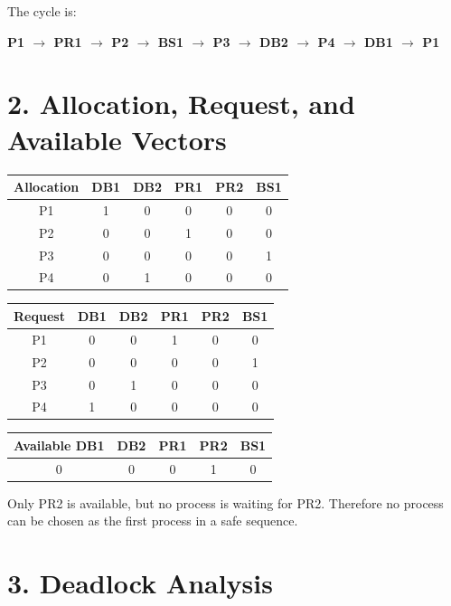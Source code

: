 \documentclass[12pt,a4paper]{article}
\begin{document}
The cycle is:

\begin{center}
\textbf{P1 $\rightarrow$ PR1 $\rightarrow$ P2 $\rightarrow$ BS1 $\rightarrow$ P3 $\rightarrow$ DB2 $\rightarrow$ P4 $\rightarrow$ DB1 $\rightarrow$ P1}
\end{center}

\section*{2. Allocation, Request, and Available Vectors}

\begin{center}
\begin{tabular}{c c c c c c}
\toprule
\textbf{Allocation} & DB1 & DB2 & PR1 & PR2 & BS1 \\
\midrule
P1 & 1 & 0 & 0 & 0 & 0 \\
P2 & 0 & 0 & 1 & 0 & 0 \\
P3 & 0 & 0 & 0 & 0 & 1 \\
P4 & 0 & 1 & 0 & 0 & 0 \\
\bottomrule
\end{tabular}
\hspace{0.6cm}
\begin{tabular}{c c c c c c}
\toprule
\textbf{Request} & DB1 & DB2 & PR1 & PR2 & BS1 \\
\midrule
P1 & 0 & 0 & 1 & 0 & 0 \\
P2 & 0 & 0 & 0 & 0 & 1 \\
P3 & 0 & 1 & 0 & 0 & 0 \\
P4 & 1 & 0 & 0 & 0 & 0 \\
\bottomrule
\end{tabular}
\end{center}

\begin{center}
\begin{tabular}{c c c c c}
\toprule
\textbf{Available DB1} & \textbf{DB2} & \textbf{PR1} & \textbf{PR2} & \textbf{BS1} \\
\midrule
0 & 0 & 0 & 1 & 0 \\
\bottomrule
\end{tabular}
\end{center}

Only PR2 is available, but no process is waiting for PR2. Therefore no process can be chosen as the first process in a safe sequence.

\section*{3. Deadlock Analysis}
\end{document}

